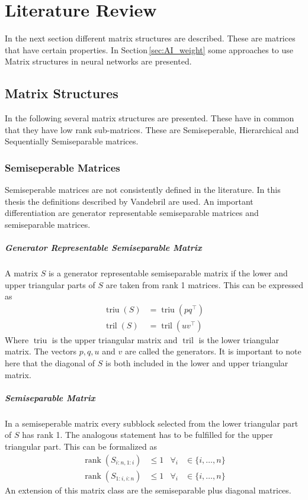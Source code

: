 \documentclass[doctype=mastersthesis,BCOR=15mm,biblatex]{ldvbook}%
\DeclareMathOperator{\rank}{rank}
\DeclareMathOperator{\triu}{triu}
\DeclareMathOperator{\tril}{tril}
\begin{document}
\chapter{Literature Review}\label{chap:lit}
In the next section different matrix structures are described.
These are matrices that have certain properties.
In Section\,\ref{sec:AI_weight} some approaches to use Matrix structures in neural networks are presented.




\section{Matrix Structures}\label{sec:mat_structures}
In the following several matrix structures are presented.
These have in common that they have low rank sub-matrices.
These are Semiseperable, Hierarchical and Sequentially Semiseparable matrices.

\subsection{Semiseperable Matrices}
Semiseperable matrices are not consistently defined in the literature. 
In this thesis the definitions described by Vandebril \cite{vandebril_bibliography_2005,vandebril_matrix_2007} are used.
An important differentiation are generator representable semiseparable matrices and semiseparable matrices.
\paragraph{Generator Representable Semiseparable Matrix}
A matrix $S$ is a generator representable semiseparable matrix if the lower and upper triangular parts of $S$ are taken from rank 1 matrices.
This can be expressed as 
\begin{align}
	\triu(S) &= \triu(pq^\top)\\
	\tril(S) &= \tril(uv^\top)
\end{align}
Where $\triu$ is the upper triangular matrix and $\tril$ is the lower triangular matrix. The vectors $p,q,u$ and $v$ are called the generators.
It is important to note here that the diagonal of $S$ is both included in the lower and upper triangular matrix.

\paragraph{Semiseparable Matrix}
In a semiseperable matrix every subblock selected from the lower triangular part of $S$ has rank 1. The analogous statement has to be fulfilled for the upper triangular part.
This can be formalized as 
\begin{align}
	\rank(S_{i:n,1:i}) &\leq 1 & \forall_i &\in\{i,\dots,n\}\\
	\rank(S_{1:i,i:n}) &\leq 1 & \forall_i &\in\{i,\dots,n\}
\end{align}
An extension of this matrix class are the semiseparable plus diagonal matrices.
\end{document}
